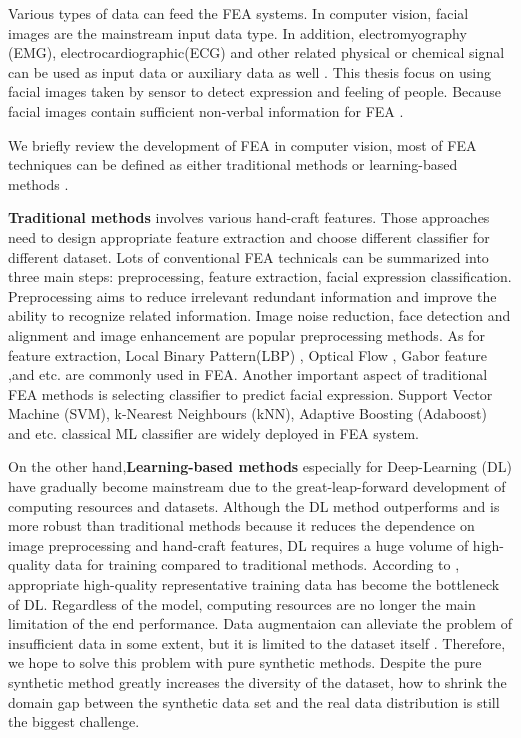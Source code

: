Various types of data can feed the FEA systems. In computer vision, facial images are the mainstream input data type. In addition, electromyography (EMG), electrocardiographic(ECG) and other related physical or chemical signal can be used as input data or auxiliary data as well \citep{jerrittaPhysiologicalSignalsBased2011}. This thesis focus on using facial images taken by sensor to detect expression and feeling of people. Because facial images contain sufficient non-verbal information for FEA \citep{huangFacialExpressionRecognition2019}. 

We briefly review the development of FEA in computer vision, most of FEA techniques can be defined as either traditional methods or learning-based methods \citep{huangFacialExpressionRecognition2019}.

\textbf{Traditional methods} involves various hand-craft features. Those approaches need to design appropriate feature extraction and choose different classifier for different dataset. Lots of conventional FEA technicals can be summarized into three main steps: preprocessing, feature extraction, facial expression classification. Preprocessing aims to reduce irrelevant redundant information and improve the ability to recognize related information. Image noise reduction, face detection and alignment and image enhancement are popular preprocessing methods. As for feature extraction, Local Binary Pattern(LBP) \citep{ahonenFaceRecognitionLocal2004}, Optical Flow \citep{hornDeterminingOpticalFlow1981}, Gabor feature \citep{lyonsCodingFacialExpressions1998},and etc. are commonly used in FEA. Another important aspect of traditional FEA methods is selecting classifier to predict facial expression. Support Vector Machine (SVM), k-Nearest Neighbours (kNN), Adaptive Boosting (Adaboost) and etc. classical ML classifier are widely deployed in FEA system. 

On the other hand,\textbf{Learning-based methods} especially for Deep-Learning (DL) have gradually become mainstream due to the great-leap-forward development of computing resources and datasets. Although the DL method outperforms and is more robust than traditional methods because it reduces the dependence on image preprocessing and hand-craft features, DL requires a huge volume of high-quality data for training compared to traditional methods. According to \citeauthor{rohSurveyDataCollection2019}, appropriate high-quality representative training data has become the bottleneck of DL. Regardless of the model, computing resources are no longer the main limitation of the end performance. Data augmentaion can alleviate the problem of insufficient data in some extent, but it is limited to the dataset itself \citep{shortenSurveyImageData2019a}. Therefore, we hope to solve this problem with pure synthetic methods. Despite the pure synthetic method greatly increases the diversity of the dataset, how to shrink the domain gap between the synthetic data set and the real data distribution is still the biggest challenge.

